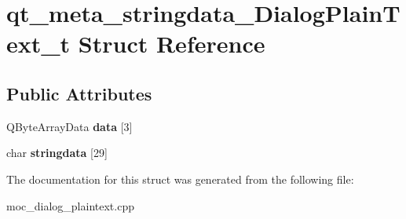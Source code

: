 \hypertarget{structqt__meta__stringdata__DialogPlainText__t}{\section{qt\-\_\-meta\-\_\-stringdata\-\_\-\-Dialog\-Plain\-Text\-\_\-t Struct Reference}
\label{structqt__meta__stringdata__DialogPlainText__t}
}
\subsection*{Public Attributes}
\begin{DoxyCompactItemize}
\item 
\hypertarget{structqt__meta__stringdata__DialogPlainText__t_a0e8ce1eed41ab449ec99fbb76eb37e53}{Q\-Byte\-Array\-Data {\bfseries data} \mbox{[}3\mbox{]}}\label{structqt__meta__stringdata__DialogPlainText__t_a0e8ce1eed41ab449ec99fbb76eb37e53}

\item 
\hypertarget{structqt__meta__stringdata__DialogPlainText__t_a5d17491d3eaf107cc3c138034ee6b8c8}{char {\bfseries stringdata} \mbox{[}29\mbox{]}}\label{structqt__meta__stringdata__DialogPlainText__t_a5d17491d3eaf107cc3c138034ee6b8c8}

\end{DoxyCompactItemize}


The documentation for this struct was generated from the following file\-:\begin{DoxyCompactItemize}
\item 
moc\-\_\-dialog\-\_\-plaintext.\-cpp\end{DoxyCompactItemize}
